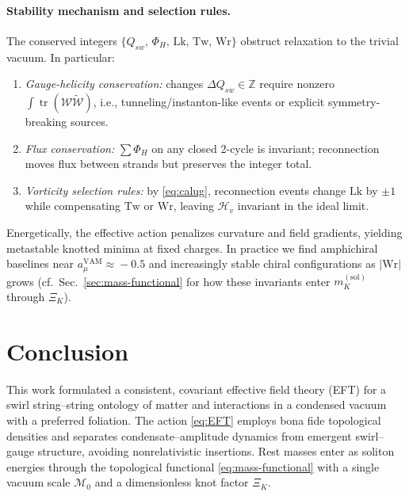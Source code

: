 \documentclass[11pt, preprint,titlepage]{revtex4-2}
\begin{document}
	\paragraph{Stability mechanism and selection rules.}
	The conserved integers \(\{Q_{\!sw},\,\Phi_H,\,\mathrm{Lk},\,\mathrm{Tw},\,\mathrm{Wr}\}\) obstruct relaxation to the trivial vacuum. In particular:
	\begin{enumerate}
		\item \textit{Gauge-helicity conservation:} changes \(\Delta Q_{\!sw}\in\mathbb{Z}\) require nonzero \(\int \mathop{\mathrm{tr}}(\mathcal{W}\tilde{\mathcal{W}})\), i.e., tunneling/instanton-like events or explicit symmetry-breaking sources.
		\item \textit{Flux conservation:} \(\sum \Phi_H\) on any closed 2-cycle is invariant; reconnection moves flux between strands but preserves the integer total.
		\item \textit{Vorticity selection rules:} by \eqref{eq:calug}, reconnection events change \(\mathrm{Lk}\) by \(\pm1\) while compensating \(\mathrm{Tw}\) or \(\mathrm{Wr}\), leaving \(\mathcal{H}_{\!v}\) invariant in the ideal limit.
	\end{enumerate}
	Energetically, the effective action penalizes curvature and field gradients, yielding metastable knotted minima at fixed charges. In practice we find amphichiral baselines near \(a_\mu^{\mathrm{VAM}}\!\approx\!-0.5\) and increasingly stable chiral configurations as \(|\mathrm{Wr}|\) grows (cf.\ Sec.~\ref{sec:mass-functional} for how these invariants enter \(m_K^{(\mathrm{sol})}\) through \(\Xi_K\)).


    \section{Conclusion}

    This work formulated a consistent, covariant effective field theory (EFT) for a swirl string–string ontology of matter and interactions in a condensed vacuum with a preferred foliation. The action \eqref{eq:EFT} employs bona fide topological densities and separates condensate–amplitude dynamics from emergent swirl–gauge structure, avoiding nonrelativistic insertions. Rest masses enter as soliton energies through the topological functional \eqref{eq:mass-functional} with a single vacuum scale \(\mathcal{M}_0\) and a dimensionless knot factor \(\Xi_K\).
\end{document}
